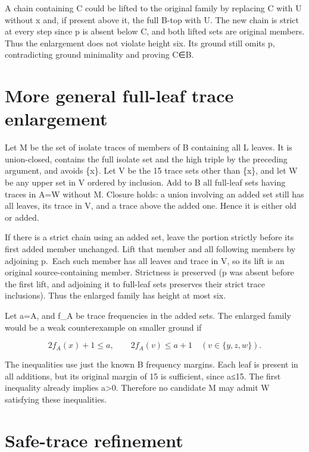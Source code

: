 \documentclass[11pt,letterpaper]{article}
\begin{document}
A chain containing C could be lifted to the original family by replacing
C with U without x and, if present above it, the full B-top with U. The
new chain is strict at every step since p is absent below C, and both
lifted sets are original members. Thus the enlargement does not violate
height six. Its ground still omits p, contradicting ground minimality
and proving C∈B.

\section{More general full-leaf trace
enlargement}\label{more-general-full-leaf-trace-enlargement}

Let M be the set of isolate traces of members of B containing all L
leaves. It is union-closed, contains the full isolate set and the high
triple by the preceding argument, and avoids \{x\}. Let V be the 15
trace sets other than \{x\}, and let W be any upper set in V ordered by
inclusion. Add to B all full-leaf sets having traces in A=W without M.
Closure holds: a union involving an added set still has all leaves, its
trace in V, and a trace above the added one. Hence it is either old or
added.

If there is a strict chain using an added set, leave the portion
strictly before its first added member unchanged. Lift that member and
all following members by adjoining p.~Each such member has all leaves
and trace in V, so its lift is an original source-containing member.
Strictness is preserved (p was absent before the first lift, and
adjoining it to full-leaf sets preserves their strict trace inclusions).
Thus the enlarged family has height at most six.

Let a=\textbar A\textbar, and f\_A be trace frequencies in the added
sets. The enlarged family would be a weak counterexample on smaller
ground if

\[
 2 f_A(x)+1\le a,\qquad 2 f_A(v)\le a+1\quad(v\in\{y,z,w\}).
\]

The inequalities use just the known B frequency margins. Each leaf is
present in all additions, but its original margin of 15 is sufficient,
since a≤15. The first inequality already implies a\textgreater0.
Therefore no candidate M may admit W satisfying these inequalities.

\section{Safe-trace refinement}\label{safe-trace-refinement}
\end{document}
